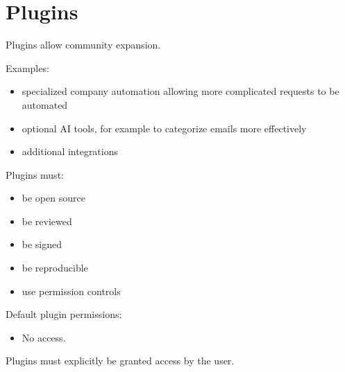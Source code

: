 
\chapter{Plugins}

Plugins allow community expansion.

Examples:
\begin{itemize}
	\item specialized company automation allowing more complicated requests to be automated
	\item optional AI tools, for example to categorize emails more effectively
	\item additional integrations
\end{itemize}

Plugins must:
\begin{itemize}
	\item be open source
	\item be reviewed
	\item be signed
	\item be reproducible
	\item use permission controls
\end{itemize}
Default plugin permissions:
\begin{itemize}
	\item[!] No access.
\end{itemize}

Plugins must explicitly be granted access by the user.


